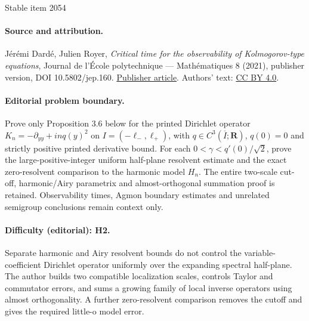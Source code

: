 \documentclass[11pt]{article}
\numberwithin{equation}{section}
\begin{document}
\begin{center}{\Large Stable item 2054}\end{center}
\paragraph{Source and attribution.}
Jérémi Dardé, Julien Royer, \emph{Critical time for the observability of Kolmogorov-type equations}, Journal de l’École polytechnique — Mathématiques 8 (2021), publisher version, DOI 10.5802/jep.160. \href{https://jep.centre-mersenne.org/articles/10.5802/jep.160/}{Publisher article}. Authors' text: \href{https://creativecommons.org/licenses/by/4.0/}{CC BY 4.0}.
\paragraph{Editorial problem boundary.}
Prove only Proposition 3.6 below for the printed Dirichlet operator \(K_n=-\partial_{yy}+in q(y)^2\) on \(I=(-\ell_-,\ell_+)\), with \(q\in C^3(\overline I;\mathbf R)\), \(q(0)=0\) and strictly positive printed derivative bound. For each \(0<\gamma<q'(0)/\sqrt2\), prove the large-positive-integer uniform half-plane resolvent estimate and the exact zero-resolvent comparison to the harmonic model \(H_n\). The entire two-scale cut-off, harmonic/Airy parametrix and almost-orthogonal summation proof is retained. Observability times, Agmon boundary estimates and unrelated semigroup conclusions remain context only.
\paragraph{Difficulty (editorial): H2.}
Separate harmonic and Airy resolvent bounds do not control the variable-coefficient Dirichlet operator uniformly over the expanding spectral half-plane. The author builds two compatible localization scales, controls Taylor and commutator errors, and sums a growing family of local inverse operators using almost orthogonality. A further zero-resolvent comparison removes the cutoff and gives the required little-o model error.
\end{document}
